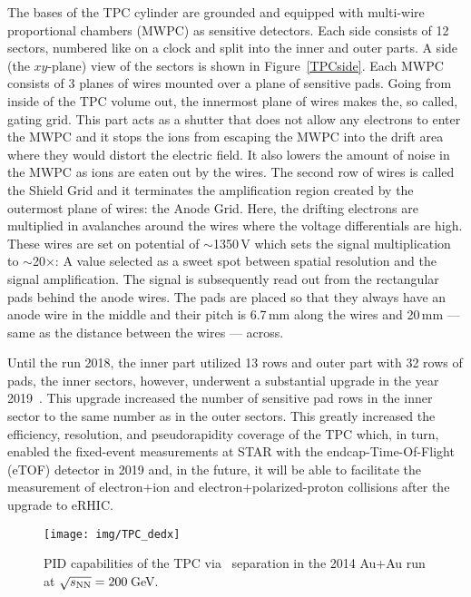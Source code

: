 The bases of the TPC cylinder are grounded and equipped with multi-wire proportional chambers
(MWPC) as sensitive detectors. Each side consists of 12 sectors, numbered like on a clock and split into 
the inner and outer parts. A side (the $xy$-plane) view of the sectors is shown in Figure~\ref{TPCside}\@. Each MWPC consists of 3 planes of wires mounted over a plane of sensitive pads. Going from inside of the TPC volume out, the innermost plane of wires makes the, so called, gating grid. This part acts as a shutter that does not allow any electrons to enter the MWPC and it stops the ions from escaping the MWPC into the drift area where they would distort the electric field. It also lowers the amount of noise in the MWPC as ions are eaten out by the wires. The second row of wires is called the Shield Grid and it terminates the amplification region created by the outermost plane of wires: the Anode Grid. Here, the drifting electrons are multiplied in avalanches around the wires where the voltage differentials are high. These wires are set on potential of $\sim$1350$\,$V which sets the signal multiplication to $\sim$20$\times$\@: A value selected as a sweet spot between spatial resolution and the signal amplification. The signal is subsequently read out from the rectangular pads behind the anode wires. The pads are placed so that they always have an anode wire in the middle and their pitch is 6.7$\,$mm along the wires and 20$\,$mm --- same as the distance between the wires --- across. 

Until the run 2018, the inner part utilized 13 rows and outer part with 32 rows of pads, the inner sectors, however, underwent a substantial 
upgrade in the year 2019~\cite{iTPC}. This upgrade increased the number of sensitive pad rows in the inner sector to the same number as in the outer sectors. This greatly
increased the efficiency, resolution, and pseudorapidity coverage of the TPC which, in turn, enabled the fixed-event measurements at STAR with the endcap-Time-Of-Flight (eTOF) detector in 2019 and, in the future, it will be able to facilitate the measurement of electron+ion and electron+polarized-proton collisions after the upgrade to eRHIC\@. 

\begin{figure}[!htb]
\begin{center}
 \texttt{[image: img/TPC\_dedx]}\\
\end{center}
\caption[PID capabilities of the TPC via \dedx\ separation in the 2014 Au+Au run at $\snn = 200\,$GeV\@.]{\label{TpcPid}PID capabilities of the TPC via \dedx\ separation in the 2014 Au+Au run at $\snn = 200\,$GeV\@.}
\end{figure}

